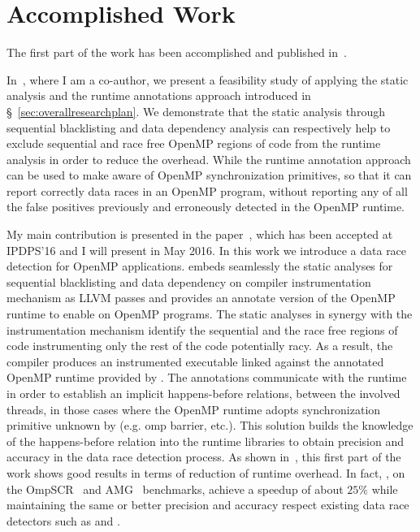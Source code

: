 \section{Accomplished Work}
\label{sec:accomplishedwork}

The first part of the work has been accomplished and published
in~\cite{Protze:2014:TPL:2688361.2688369, atzeni2016}.

In~\cite{Protze:2014:TPL:2688361.2688369}, where I am a co-author, we present
a feasibility study of applying the static analysis and the runtime
annotations approach introduced in \S~\ref{sec:overallresearchplan}.
%
We demonstrate that the static analysis through sequential blacklisting and
data dependency analysis can respectively help to exclude sequential and race
free OpenMP regions of code from the runtime analysis in order to reduce the
overhead.
%
While the runtime annotation approach can be used to make \tsan aware of
OpenMP synchronization primitives, so that it can report correctly data races
in an OpenMP program, without reporting any of all the false positives
previously and erroneously detected in the OpenMP runtime.

My main contribution is presented in the paper~\cite{atzeni2016}, which has
been accepted at IPDPS'16 and I will present in May 2016.
%
In this work we introduce \archer a data race detection for OpenMP applications.
%
\archer embeds seamlessly the static analyses for sequential blacklisting and
data dependency on \tsan compiler instrumentation mechanism as LLVM passes and
provides an annotate version of the OpenMP runtime to enable \tsan on OpenMP
programs.
%
The static analyses in synergy with the instrumentation mechanism identify the
sequential and the race free regions of code instrumenting only the rest of
the code potentially racy.
%
As a result, the compiler produces an instrumented executable linked against
the annotated OpenMP runtime provided by \archer.
%
The annotations communicate with the \tsan runtime in order to establish an
implicit happens-before relations, between the involved threads, in those
cases where the OpenMP runtime adopts synchronization primitive unknown by
\tsan (e.g. omp barrier, etc.).
%
This solution builds the knowledge of the happens-before relation into the
runtime libraries to obtain precision and accuracy in the data race detection
process.
%
As shown in~\cite{atzeni2016}, this first part of the work shows good results
in terms of reduction of runtime overhead.
%
In fact, \archer, on the OmpSCR~\cite{ompscr} and AMG~\cite{amg2013}
benchmarks, achieve a speedup of about $25\%$ while maintaining the same or
better precision and accuracy respect existing data race detectors such as
\insp and \tsan.

